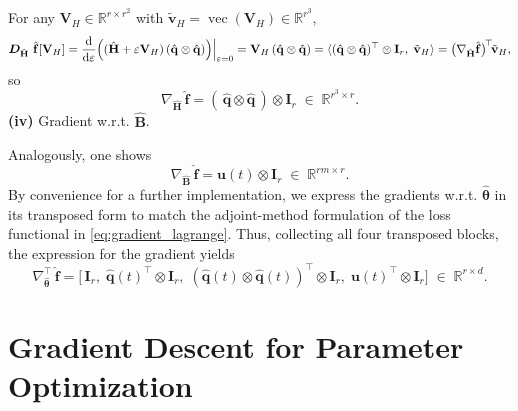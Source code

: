 For any $\mathbf{V}_H\in\mathbb{R}^{r\times r^2}$ with $\tilde{\mathbf{v}}_H=\operatorname{vec}(\mathbf{V}_H)\in\mathbb{R}^{r^3}$,\\
$$\bm{D}_{\hat{\mathbf{H}}}~\hat{\mathbf{f}}[\mathbf{V}_H]=\dv{}{\varepsilon}\Bigl((\hat{\mathbf{H}}+\varepsilon\mathbf{V}_H)\,(\hat{\mathbf{q}}\otimes\hat{\mathbf{q}})\Bigr)\Big|_{\varepsilon=0}=\mathbf{V}_H\,(\hat{\mathbf{q}}\otimes\hat{\mathbf{q}})=\langle(\hat{\mathbf{q}}\otimes\hat{\mathbf{q}})^{\top}\otimes\mathbf{I}_r,\;\tilde{\mathbf{v}}_H\rangle=\bigl(\nabla_{\hat{\mathbf{H}}}\hat{\mathbf{f}}\bigr)^{\!\top}\!\tilde{\mathbf{v}}_H,$$
so\\
$$\nabla_{\hat{\mathbf{H}}}\,\hat{\mathbf{f}}=(\,\hat{\mathbf{q}}\otimes\hat{\mathbf{q}}\,)\otimes\mathbf{I}_r\;\in\;\mathbb{R}^{r^3\times r}.$$
\noindent\textbf{(iv)} Gradient w.r.t. $\hat{\mathbf{B}}$.

Analogously, one shows\\
$$\nabla_{\hat{\mathbf{B}}}\,\hat{\mathbf{f}}=\mathbf{u}(t)\otimes\mathbf{I}_r\;\in\;\mathbb{R}^{rm\times r}.$$
By convenience for a further implementation, we express the gradients w.r.t. $\hat{\bm{\theta}}$ in its transposed form to match the adjoint-method formulation of the loss functional in \eqref{eq:gradient_lagrange}.
Thus, collecting all four transposed blocks, the expression for the gradient yields\\
\begin{equation}
  \label{eq:gradient_2}
  \nabla_{\hat{\bm{\theta}}}^{\top}\,\hat{\mathbf{f}}=\bigl[\,\mathbf{I}_r,\;\hat{\mathbf{q}}(t)^{\!\top}\otimes\mathbf{I}_r,\;(\hat{\mathbf{q}}(t)\otimes\hat{\mathbf{q}}(t))^{\!\top}\otimes\mathbf{I}_r,\;\mathbf{u}(t)^{\!\top}\otimes\mathbf{I}_r\bigr]\;\in\;\mathbb{R}^{r\times d}.
\end{equation}

\section{Gradient Descent for Parameter Optimization}
\label{sec:gd_opt}

